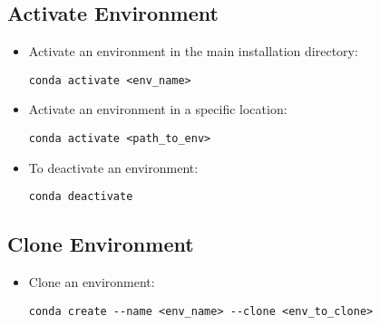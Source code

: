 
\subsection{Activate Environment}
\label{conda:activateEnv}

\begin{itemize}
    \item Activate an environment in the main installation directory:
    \begin{verbatim}
conda activate <env_name>
    \end{verbatim}
    \item Activate an environment in a specific location:
    \begin{verbatim}
conda activate <path_to_env>
    \end{verbatim}
    \item To deactivate an environment:
    \begin{verbatim}
conda deactivate
    \end{verbatim}
\end{itemize}


\subsection{Clone Environment}

\begin{itemize}
    \item Clone an environment:
    \begin{verbatim}
conda create --name <env_name> --clone <env_to_clone>
    \end{verbatim}
\end{itemize}


